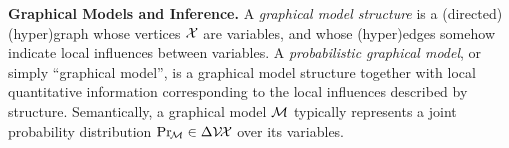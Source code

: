 \documentclass[twoside]{article}
\newcommand\discard[1]{}
\begin{document}
\textbf{Graphical Models and Inference.}
A \emph{graphical model structure}
is a (directed) (hyper)graph whose vertices $\mathcal X$ are variables, and whose (hyper)edges somehow indicate local influences between variables.
A \emph{probabilistic graphical model},
or simply  ``graphical model'',
is a
graphical model structure
together with local quantitative information corresponding to the local influences described by structure.
%
Semantically,
a graphical model $\cal M$
typically
represents a joint probability distribution $\Pr_{\!\cal M}
 \in \Delta \mathcal V\!\mathcal X$ over its variables.
\discard{
Although there is often more to the story,
it can typically be
expressed as a product
$\Pr_{\cal M}(\X) \propto \prod_{E \in \Ed} \phi_{E}(E)$
of factors
$\boldsymbol\phi = 
\{ \phi_E : \V E \to \mathbb R_{\ge 0} \}_{E \in \Ed}$
over a hypergraph $(\X, \Ed)$ closely related to the structure of $\cal M$.
For this reason, some authors use the term ``graphical model'' to refer to a tuple $(\X ,\Ed, \boldsymbol\phi)$,
i.e., a factor graph.
PDGs, however, do not represent probabilities this way.}
\end{document}
